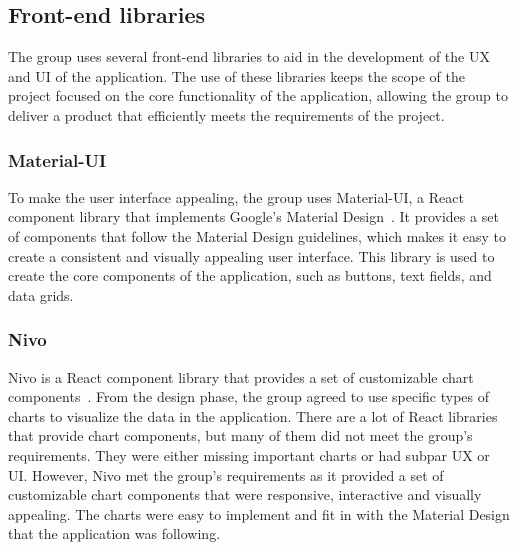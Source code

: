 \subsection{Front-end libraries}\label{subsec:front-end-libraries}

The group uses several front-end libraries to aid in the development of the UX and UI of the application.
The use of these libraries keeps the scope of the project focused on the core functionality of the application, allowing
the group to deliver a product that efficiently meets the requirements of the project.

\subsubsection{Material-UI}\label{subsubsec:material-ui}

To make the user interface appealing, the group uses Material-UI, a React component library that implements Google's
Material Design~\cite{material-ui}.
It provides a set of components that follow the Material Design guidelines, which makes it easy to create a consistent
and visually appealing user interface.
This library is used to create the core components of the application, such as buttons, text fields, and data grids.

\subsubsection{Nivo}\label{subsubsec:nivo}

Nivo is a React component library that provides a set of customizable chart components~\cite{nivo2024}.
From the design phase, the group agreed to use specific types of charts to visualize the data in the application.
There are a lot of React libraries that provide chart components, but many of them did not meet the group's requirements.
They were either missing important charts or had subpar UX or UI.\@
However, Nivo met the group's requirements as it provided a set of customizable chart components that were 
responsive, interactive and visually appealing.
The charts were easy to implement and fit in with the Material Design that the application was following.
